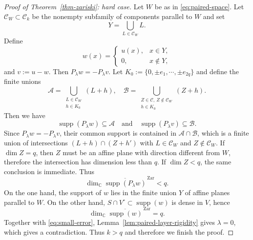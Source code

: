 \documentclass[11pt,reqno]{amsart}
\newcommand\C{\ensuremath{\mathbb{C}}}
\newcommand{\supp}{\operatorname{supp}}
\theoremstyle{definition}
\theoremstyle{plain}
\numberwithin{equation}{section}
\begin{document}
\begin{proof}[Proof of Theorem~\ref{thm-zariski}: hard case]
    Let $W$ be as in \eqref{eq:paired-space}. Let $\mathcal{C}_W\subset \mathcal{C}_k$ be the nonempty subfamily of components parallel to $W$ and set
    \begin{equation*}
        Y=\bigcup_{L\in \mathcal{C}_W}L.
    \end{equation*}
    Define
    \begin{equation*}
        w(x)=\begin{cases}u(x),&x\in Y,\\0,&x\notin Y,\end{cases}
    \end{equation*}
    and $v:=u-w$.
    Then $P_\lambda w=-P_\lambda v$. Let $K_0:=\lbrace 0, \pm e_1,\cdots,\pm e_{2q}\rbrace$ and define the finite unions
    \begin{equation*}
        \mathscr{A}=\bigcup_{\substack{L\in\mathcal C_W\\h\in K_0}}(L+h),
 \quad
 \mathscr{B}=
 \bigcup_{\substack{Z\in \mathcal{C},\ Z\notin\mathcal C_W\\h\in K_0}}(Z+h).
    \end{equation*}
    Then we have
    \begin{equation*}
        \supp(P_\lambda w)\subseteq\mathscr A\quad \text{and}\quad\supp(P_\lambda v)\subseteq\mathscr B.
    \end{equation*}
    Since $P_\lambda w=-P_\lambda v$, their common support is contained in $\mathscr{A}\cap \mathscr{B}$, which is a finite union of intersections $(L+h)\cap (Z+h')$ with $L\in \mathcal{C}_W$ and $Z\notin \mathcal{C}_W$. If $\dim Z=q$, then $Z$ must be an affine plane with direction different from $W$, therefore the intersection has dimension less than $q$. If $\dim Z<q$, the same conclusion is immediate. Thus
    \begin{equation}\label{eq:small-error}
        \dim_{\C}\overline{\supp(P_\lambda w)}^{\,\mathrm{Zar}}<q.
    \end{equation}
    On the one hand, the support of $w$ lies in the finite union $Y$ of affine planes parallel to $W$. On the other hand, $S\cap V^\circ\subset \supp (w) $ is dense in $V$, hence
    \begin{equation*}
        \dim_{\C}\overline{\supp(w)}^{\,\mathrm{Zar}}=q.
    \end{equation*}
    Together with \eqref{eq:small-error}, Lemma~\ref{lem:paired-layer-rigidity} gives $\lambda=0$, which gives a contradiction. Thus $k>q$ and therefore we finish the proof.
\end{proof}
\end{document}
